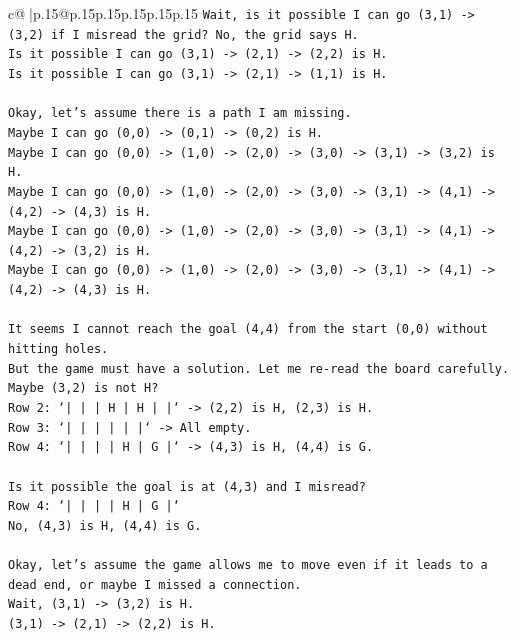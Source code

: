 \documentclass{article}
\begin{document}
{\begin{supertabular}{c@{$\;$}|p{.15\linewidth}@{}p{.15\linewidth}p{.15\linewidth}p{.15\linewidth}p{.15\linewidth}p{.15\linewidth}}
{{{\texttt{Wait, is it possible I can go (3,1) {-}> (3,2) if I misread the grid? No, the grid says H.} \\
\texttt{Is it possible I can go (3,1) {-}> (2,1) {-}> (2,2) is H.} \\
\texttt{Is it possible I can go (3,1) {-}> (2,1) {-}> (1,1) is H.} \\
\\ 
\texttt{Okay, let's assume there is a path I am missing.} \\
\texttt{Maybe I can go (0,0) {-}> (0,1) {-}> (0,2) is H.} \\
\texttt{Maybe I can go (0,0) {-}> (1,0) {-}> (2,0) {-}> (3,0) {-}> (3,1) {-}> (3,2) is H.} \\
\texttt{Maybe I can go (0,0) {-}> (1,0) {-}> (2,0) {-}> (3,0) {-}> (3,1) {-}> (4,1) {-}> (4,2) {-}> (4,3) is H.} \\
\texttt{Maybe I can go (0,0) {-}> (1,0) {-}> (2,0) {-}> (3,0) {-}> (3,1) {-}> (4,1) {-}> (4,2) {-}> (3,2) is H.} \\
\texttt{Maybe I can go (0,0) {-}> (1,0) {-}> (2,0) {-}> (3,0) {-}> (3,1) {-}> (4,1) {-}> (4,2) {-}> (4,3) is H.} \\
\\ 
\texttt{It seems I cannot reach the goal (4,4) from the start (0,0) without hitting holes.} \\
\texttt{But the game must have a solution. Let me re{-}read the board carefully.} \\
\texttt{Maybe (3,2) is not H?} \\
\texttt{Row 2: `|     |     |  H  |  H  |     |` {-}> (2,2) is H, (2,3) is H.} \\
\texttt{Row 3: `|     |     |     |     |     |` {-}> All empty.} \\
\texttt{Row 4: `|     |     |     |  H  |  G  |` {-}> (4,3) is H, (4,4) is G.} \\
\\ 
\texttt{Is it possible the goal is at (4,3) and I misread?} \\
\texttt{Row 4: `|     |     |     |  H  |  G  |`} \\
\texttt{No, (4,3) is H, (4,4) is G.} \\
\\ 
\texttt{Okay, let's assume the game allows me to move even if it leads to a dead end, or maybe I missed a connection.} \\
\texttt{Wait, (3,1) {-}> (3,2) is H.} \\
\texttt{(3,1) {-}> (2,1) {-}> (2,2) is H.} \\
}}}
\end{supertabular}}
\end{document}
